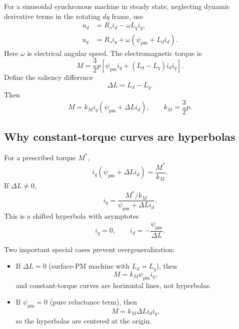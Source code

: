 \documentclass[11pt,a4paper]{article}
\newcommand{\id}{i_d}
\newcommand{\iq}{i_q}
\newcommand{\Rs}{R_s}
\newcommand{\Ld}{L_d}
\newcommand{\Lq}{L_q}
\newcommand{\psipm}{\psi_{\mathrm{pm}}}
\newcommand{\w}{\omega}
\begin{document}
For a sinusoidal synchronous machine in steady state, neglecting dynamic derivative terms in the rotating $dq$ frame, use
\begin{align}
  u_d &= \Rs\id-\w\Lq\iq,\\
  u_q &= \Rs\iq+\w(\psipm+\Ld\id).
  \label{eq:psm-voltage}
\end{align}
Here $\omega$ is electrical angular speed. The electromagnetic torque is
\begin{equation}
  M=\frac{3}{2}p\left[\psipm\iq+(\Ld-\Lq)\id\iq\right].
  \label{eq:psm-torque}
\end{equation}
Define the saliency difference
\begin{equation}
  \Delta L=\Ld-\Lq.
\end{equation}
Then
\begin{equation}
  M=k_M\iq(\psipm+\Delta L\id),
  \qquad k_M=\frac{3}{2}p.
  \label{eq:psm-torque-factor}
\end{equation}

\subsection{Why constant-torque curves are hyperbolas}

For a prescribed torque $M^*$,
\begin{equation}
  \iq(\psipm+\Delta L\id)=\frac{M^*}{k_M}.
\end{equation}
If $\Delta L\neq0$,
\begin{equation}
  \iq=\frac{M^*/k_M}{\psipm+\Delta L\id}.
  \label{eq:torque-hyperbola}
\end{equation}
This is a shifted hyperbola with asymptotes
\begin{equation}
  \iq=0,
  \qquad
  \id=-\frac{\psipm}{\Delta L}.
\end{equation}

Two important special cases prevent overgeneralization:

\begin{itemize}
  \item If $\Delta L=0$ (surface-PM machine with $L_d=L_q$), then
  \begin{equation}
    M=k_M\psipm\iq,
  \end{equation}
  and constant-torque curves are horizontal lines, not hyperbolas.
  \item If $\psipm=0$ (pure reluctance term), then
  \begin{equation}
    M=k_M\Delta L\id\iq,
  \end{equation}
  so the hyperbolas are centered at the origin.
\end{itemize}
\end{document}
